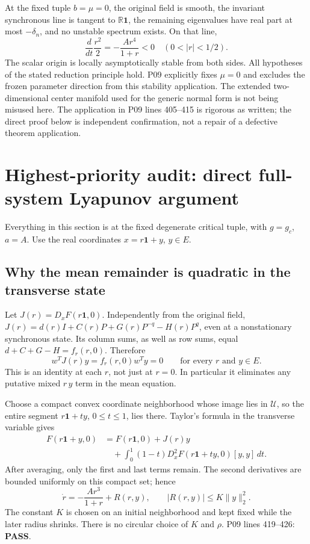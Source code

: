 \documentclass[11pt]{article}
\newcommand{\one}{\mathbf{1}}
\newcommand{\R}{\mathbb R}
\newcommand{\U}{\mathcal U}
\newcommand{\norm}[1]{\lVert#1\rVert}
\newcommand{\lin}[1]{P09 lines #1}
\newcommand{\pass}{\textbf{PASS}}
\begin{document}
At the fixed tuple $b=\mu=0$, the original field is smooth, the invariant
synchronous line is tangent to $\R\one$, the remaining eigenvalues have
real part at most $-\delta_n$, and no unstable spectrum exists. On that
line,
\[
 \frac{d}{dt}\frac{r^2}{2}=-\frac{Ar^4}{1+r}<0
 \quad(0<|r|<1/2).
\]
The scalar origin is locally asymptotically stable from both sides.
All hypotheses of the stated reduction principle hold. P09 explicitly
fixes $\mu=0$ and excludes the frozen parameter direction from this
stability application. The extended two-dimensional center manifold
used for the generic normal form is not being misused here. The
application in \lin{405--415} is rigorous as written; the direct proof
below is independent confirmation, not a repair of a defective theorem
application.

\section{Highest-priority audit: direct full-system Lyapunov argument}
\label{sec:lyap}
Everything in this section is at the fixed degenerate critical tuple,
with $g=g_c$, $a=A$. Use the real coordinates $x=r\one+y$, $y\in E$.

\subsection{Why the mean remainder is quadratic in the transverse state}
Let $J(r)=D_xF(r\one,0)$. Independently from the original field,
$J(r)=d(r)I+C(r)P+G(r)P^{-q}-H(r)P^q$, even at a nonstationary
synchronous state. Its column sums, as well as row sums, equal
$d+C+G-H=f_r(r,0)$. Therefore
\[
 w^TJ(r)y=f_r(r,0)w^Ty=0\qquad\text{for every }r\text{ and }y\in E.
\]
This is an identity at each $r$, not just at $r=0$. In particular it
eliminates any putative mixed $r\,y$ term in the mean equation.

Choose a compact convex coordinate neighborhood whose image lies in $\U$,
so the entire segment $r\one+t y$, $0\le t\le1$, lies there. Taylor's
formula in the transverse variable gives
\begin{align*}
 F(r\one+y,0)&=F(r\one,0)+J(r)y\\
 &\quad+\int_0^1(1-t)D_x^2F(r\one+t y,0)[y,y]\,dt.
\end{align*}
After averaging, only the first and last terms remain. The second
derivatives are bounded uniformly on this compact set; hence
\[
 \dot r=-\frac{Ar^3}{1+r}+R(r,y),\qquad
 |R(r,y)|\le K\norm y_2^2.
\]
The constant $K$ is chosen on an initial neighborhood and kept fixed while
the later radius shrinks. There is no circular choice of $K$ and $\rho$.
\lin{419--426}: \pass.
\end{document}
